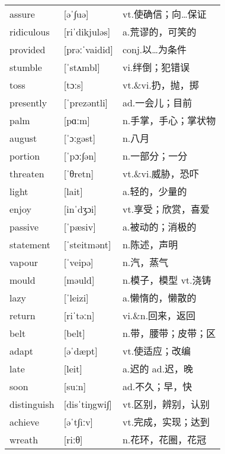 \documentclass[a4paper]{article}
\begin{document}
\section{}
\begin{tabular}{l l l}

assure & [əˈ∫uə] & vt.使确信；向…保证 \\
ridiculous & [riˈdikjuləs] & a.荒谬的，可笑的 \\
provided & [prəːˈvaidid] & conj.以…为条件 \\
stumble & [ˈstʌmbl] & vi.绊倒；犯错误 \\
toss & [tɔːs] & vt.\&vi.扔，抛，掷 \\
presently & [ˈprezəntli] & ad.一会儿；目前 \\
palm & [pɑːm] & n.手掌，手心；掌状物 \\
august & [ˈɔːgəst] & n.八月 \\
portion & [ˈpɔː∫ən] & n.一部分；一分 \\
threaten & [ˈθretn] & vt.\&vi.威胁，恐吓 \\
light & [lait] & a.轻的，少量的 \\
enjoy & [inˈdʒɔi] & vt.享受；欣赏，喜爱 \\
passive & [ˈpæsiv] & a.被动的；消极的 \\
statement & [ˈsteitmənt] & n.陈述，声明 \\
vapour & [ˈveipə] & n.汽，蒸气 \\
mould & [məuld] & n.模子，模型 vt.浇铸 \\
lazy & [ˈleizi] & a.懒惰的，懒散的 \\
return & [riˈtəːn] & vi.\&n.回来，返回 \\
belt & [belt] & n.带，腰带；皮带；区 \\
adapt & [əˈdæpt] & vt.使适应；改编 \\
late & [leit] & a.迟的 ad.迟，晚 \\
soon & [suːn] & ad.不久；早，快 \\
distinguish & [disˈtiŋgwi∫] & vt.区别，辨别，认别 \\
achieve & [əˈt∫iːv] & vt.完成，实现；达到 \\
wreath & [riːθ] & n.花环，花圈，花冠 \\

\end{tabular}
\end{document}
